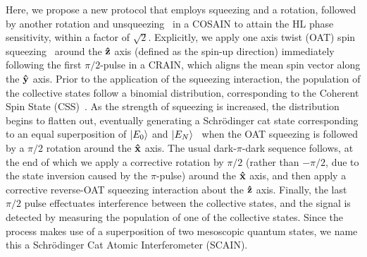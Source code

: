 \documentclass[aps,pra,letterpaper,superscriptaddress,showpacs,amsmath,floats,twocolumn]{revtex4-1}
\begin{document}
Here, we propose a new protocol that employs squeezing and a rotation, followed by another rotation and unsqueezing~\cite{Yurke, Toscano, Goldstein} in a COSAIN to attain the HL phase sensitivity, within a factor of $\sqrt{2}$. Explicitly, we apply one axis twist (OAT) spin squeezing~\cite{Kitagawa,Schleier,Leroux1,Leroux2,Gil,Guo,Sondberg} around the $\vu{z}$ axis (defined as the spin-up direction) immediately following the first $\pi/2$-pulse in a CRAIN, which aligns the mean spin vector along the $\vu{y}$ axis. Prior to the application of the squeezing interaction, the population of the collective states follow a binomial distribution, corresponding to the Coherent Spin State (CSS)~\cite{Arecchi}. As the strength of squeezing is increased, the distribution begins to flatten out, eventually generating a Schr\"odinger cat state corresponding to an equal superposition of $\ket{E_0}$ and $\ket{E_N}$~\cite{Molmer} when the OAT squeezing is followed by a $\pi/2$ rotation around the $\vu{x}$ axis. The usual dark-$\pi$-dark sequence follows, at the end of which we apply a corrective rotation by $\pi/2$ (rather than $-\pi/2$, due to the state inversion caused by the $\pi$-pulse) around the $\vu{x}$ axis, and then apply a corrective reverse-OAT squeezing interaction about the $\vu{z}$ axis. Finally, the last $\pi/2$ pulse effectuates interference between the collective states, and the signal is detected by measuring the population of one of the collective states. Since the process makes use of a superposition of two mesoscopic quantum states, we name this a Schr\"odinger Cat Atomic Interferometer (SCAIN).
\end{document}
